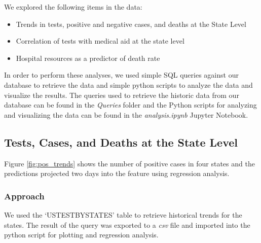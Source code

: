 \documentclass[11pt]{article}
\begin{document}
\noindent
We explored the following items in the data:
\begin{itemize}
    \item Trends in tests, positive and negative cases, and deaths at the State Level
    \item Correlation of tests with medical aid at the state level
    \item Hospital resources as a predictor of death rate
\end{itemize}
In order to perform these analyses, we used simple SQL queries against our database to retrieve the data and simple python scripts to analyze the data and visualize the results. The queries used to retrieve the historic data from our database can be found in the \textit{Queries} folder and the Python scripts for analyzing and visualizing the data can be found in the \textit{analysis.ipynb} Jupyter Notebook.

\pagebreak

\subsection{Tests, Cases, and Deaths at the State Level}
\label{subsec:StateLevel}

\noindent
Figure \ref{fig:pos_trends} shows the number of positive cases in four states and the predictions projected two days into the feature using regression analysis.
\subsubsection{Approach}
We used the `USTESTBYSTATES' table to retrieve historical trends for the states. The result of the query was exported to a \textit{csv} file and imported into the python script for plotting and regression analysis.
\end{document}

